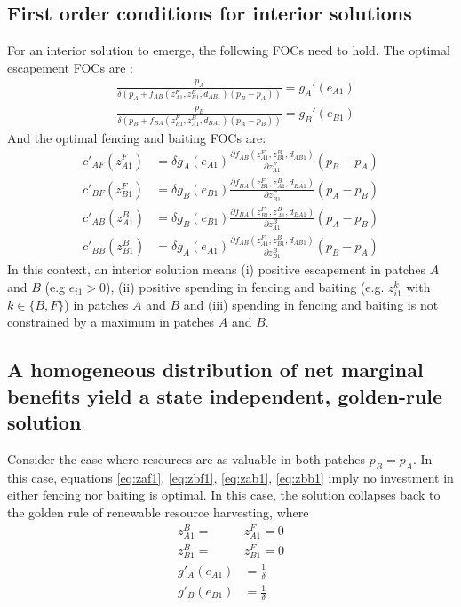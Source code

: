 \documentclass{article}
\begin{document}
\subsection{First order conditions for interior solutions}
For an interior solution to emerge, the following FOCs need to hold. 
The optimal escapement FOCs are : 
\begin{align}
&\frac{p_A}{\delta \left(p_A + f_{AB}(z_{A1}^F, z_{B1}^B, d_{AB1})(p_B-p_A)\right)} = g_A'(e_{A1}) \label{eq:ea1}\\
%
&\frac{p_B}{\delta \left( p_B + f_{BA}(z_{B1}^F, z_{A1}^B, d_{BA1})(p_A-p_B)\right)} = g_B'(e_{B1}) \label{eq:ea2}
\end{align}
And the optimal fencing and baiting FOCs are:
\begin{align}
c'_{AF}(z_{A1}^F) &= \delta g_A(e_{A1}) \frac{\partial f_{AB}(z_{A1}^F, z_{B1}^B, d_{AB1})}{\partial z_{A1}^F}\left(p_B - p_A \right) \label{eq:zaf1}\\
%
c'_{BF}(z_{B1}^F) &= \delta g_B(e_{B1}) \frac{\partial f_{BA}(z_{B1}^F, z_{A1}^B, d_{BA1})}{\partial z_{B1}^F}(p_A - p_B) \label{eq:zbf1}\\
%
c'_{AB}(z_{A1}^B) &= \delta  g_B(e_{B1})\frac{\partial f_{BA}(z_{B1}^F, z_{A1}^B, d_{BA1})}{\partial z_{A1}^B}(p_A - p_B) \label{eq:zab1}\\
%
c'_{BB}(z_{B1}^B) & = \delta g_A(e_{A1}) \frac{\partial f_{AB}(z_{A1}^F, z_{B1}^B, d_{AB1})}{\partial z_{B1}^B}(p_{B} - p_{A})
\label{eq:zbb1}
\end{align}
In this context, an interior solution means (i) positive escapement in patches $A$ and $B$ (e.g $e_{i1}>0$), (ii) positive spending in fencing and baiting (e.g. $z_{i1}^k$ with $k \in \{B, F\}$) in patches $A$ and $B$ and (iii) spending in fencing and baiting is not constrained by a maximum in patches $A$ and $B$. 
\\
\subsection{A homogeneous distribution of net marginal benefits yield a state independent, golden-rule solution}
 Consider the case where resources are as valuable in both patches $p_B = p_A$. In this case, equations \ref{eq:zaf1}, \ref{eq:zbf1}, \ref{eq:zab1}, \ref{eq:zbb1} imply no investment in either fencing nor baiting is optimal. In this case, the solution collapses back to the golden rule of renewable resource harvesting, where 
\begin{align*}
z_{A1}^B =& z_{A1}^F = 0\\
z_{B1}^B =& z_{B1}^F = 0\\
g'_A(e_{A1}) &= \frac{1}{\delta}\\
g'_B(e_{B1}) &= \frac{1}{\delta}
\end{align*}
\end{document}
